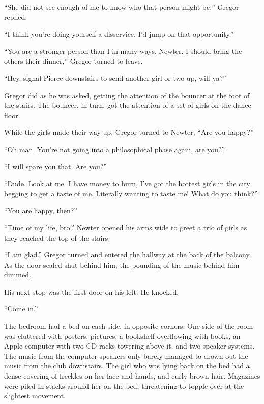 ``She did not see enough of me to know who that person might be,'' Gregor replied.



``I think you're doing yourself a disservice.  I'd jump on that opportunity.''



``You are a stronger person than I in many ways, Newter.  I should bring the others their dinner,'' Gregor turned to leave.



``Hey, signal Pierce downstairs to send another girl or two up, will ya?''



Gregor did as he was asked, getting the attention of the bouncer at the foot of the stairs.  The bouncer, in turn, got the attention of a set of girls on the dance floor.



While the girls made their way up, Gregor turned to Newter, ``Are you happy?''



``Oh man.  You're not going into a philosophical phase again, are you?''



``I will spare you that.  Are you?''



``Dude.  Look at me.  I have money to burn, I've got the hottest girls in the city begging to get a taste of me.  Literally wanting to taste me!  What do you think?''



``You are happy, then?''



``Time of my life, bro.''  Newter opened his arms wide to greet a trio of girls as they reached the top of the stairs.



``I am glad.''  Gregor turned and entered the hallway at the back of the balcony.  As the door sealed shut behind him, the pounding of the music behind him dimmed.



His next stop was the first door on his left.  He knocked.



``Come in.''



The bedroom had a bed on each side, in opposite corners.  One side of the room was cluttered with posters, pictures, a bookshelf overflowing with books, an Apple computer with two CD racks towering above it, and two speaker systems.  The music from the computer speakers only barely managed to drown out the music from the club downstairs.  The girl who was lying back on the bed had a dense covering of freckles on her face and hands, and curly brown hair.  Magazines were piled in stacks around her on the bed, threatening to topple over at the slightest movement.



